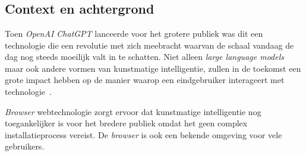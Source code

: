 
\chapter{}
\label{ch:inleiding}



\section{Context en achtergrond} %
Toen \textit{OpenAI ChatGPT} lanceerde voor het grotere publiek was dit een technologie die een revolutie met zich meebracht waarvan de schaal vandaag de dag nog steeds moeilijk valt in te schatten. Niet alleen \textit{large language models} maar ook andere vormen van kunstmatige intelligentie, zullen in de toekomst een grote impact hebben op de manier waarop een eindgebruiker interageert met technologie~\autocite{Marr2023}.

\bigbreak{}

\textit{Browser} webtechnologie zorgt ervoor dat kunstmatige intelligentie nog toegankelijker is voor het bredere publiek omdat het geen complex in\-sta\-lla\-tie\-pro\-cess vereist. De \textit{browser} is ook een bekende omgeving voor vele gebruikers.

